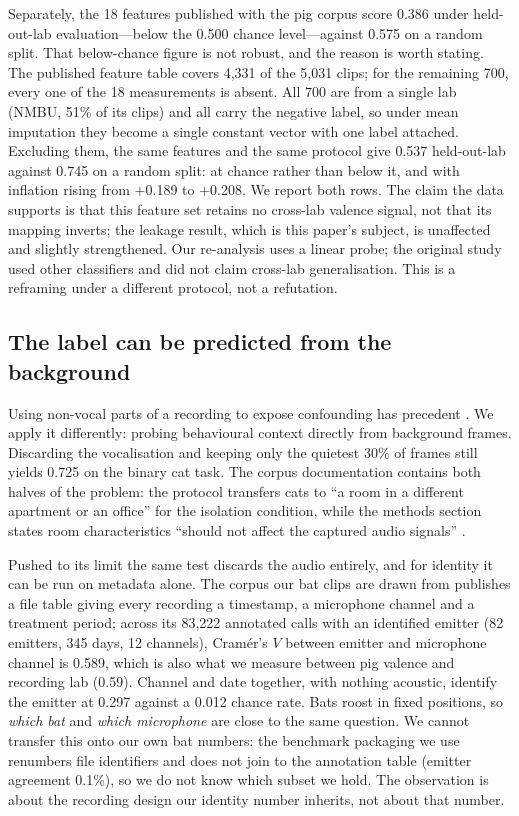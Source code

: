 \documentclass{article}
\begin{document}
Separately, the 18 features published with the pig corpus score 0.386 under held-out-lab
evaluation---below the 0.500 chance level---against 0.575 on a random split. That below-chance figure
is not robust, and the reason is worth stating. The published feature table covers 4{,}331 of the
5{,}031 clips; for the remaining 700, every one of the 18 measurements is absent. All 700 are from a
single lab (NMBU, 51\% of its clips) and all carry the negative label, so under mean imputation they
become a single constant vector with one label attached. Excluding them, the same features and the
same protocol give 0.537 held-out-lab against 0.745 on a random split: at chance rather than below
it, and with inflation rising from $+$0.189 to $+$0.208. We report both rows. The claim the data
supports is that this feature set retains no cross-lab valence signal, not that its mapping inverts;
the leakage result, which is this paper's subject, is unaffected and slightly strengthened. Our
re-analysis uses a linear probe; the original study used other classifiers and did not claim cross-lab
generalisation. This is a reframing under a different protocol, not a refutation.

\subsection{The label can be predicted from the background}

Using non-vocal parts of a recording to expose confounding has precedent \citep{stowell2019}. We
apply it differently: probing behavioural context directly from background frames. Discarding the
vocalisation and keeping only the quietest 30\% of frames still yields 0.725 on the binary cat task.
The corpus documentation contains both halves of the problem: the protocol transfers cats to ``a room
in a different apartment or an office'' for the isolation condition, while the methods section states
room characteristics ``should not affect the captured audio signals'' \citep{ntalampiras2019}.

Pushed to its limit the same test discards the audio entirely, and for identity it can be run on
metadata alone. The corpus our bat clips are drawn from \citep{prat2017} publishes a file table
giving every recording a timestamp, a microphone channel and a treatment period; across its 83{,}222
annotated calls with an identified emitter (82 emitters, 345 days, 12 channels), Cram\'er's $V$
between emitter and microphone channel is 0.589, which is also what we measure between pig valence and
recording lab (0.59). Channel and date together, with nothing acoustic, identify the emitter at 0.297
against a 0.012 chance rate. Bats roost in fixed positions, so \emph{which bat} and \emph{which
microphone} are close to the same question. We cannot transfer this onto our own bat numbers: the
benchmark packaging we use renumbers file identifiers and does not join to the annotation table
(emitter agreement 0.1\%), so we do not know which subset we hold. The observation is about the
recording design our identity number inherits, not about that number.
\end{document}
